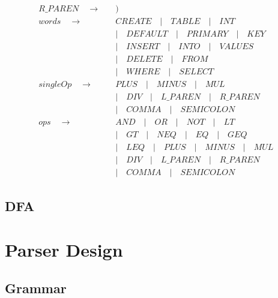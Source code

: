 \documentclass{article}
\begin{document}
\begin{align*}
R\_PAREN \quad\to\quad & \texttt{)} \\
words \quad\to\quad & CREATE \quad | \quad TABLE  \quad | \quad INT \\
&| \quad DEFAULT \quad | \quad PRIMARY \quad | \quad KEY \quad \\
&| \quad INSERT \quad | \quad INTO \quad | \quad VALUES \quad \\
&| \quad DELETE \quad | \quad FROM \quad \\
&| \quad WHERE \quad | \quad SELECT \\
singleOp \quad\to\quad &
PLUS \quad | \quad MINUS \quad | \quad MUL \\
&| \quad DIV \quad | \quad L\_PAREN \quad | \quad R\_PAREN \\
&| \quad COMMA \quad | \quad SEMICOLON \\
ops \quad\to\quad &
AND \quad | \quad OR \quad | \quad NOT \quad | \quad LT \\
&| \quad GT \quad | \quad NEQ \quad | \quad EQ \quad | \quad GEQ \\
&| \quad LEQ \quad | \quad PLUS \quad | \quad MINUS \quad | \quad MUL \\
&| \quad DIV \quad | \quad L\_PAREN \quad | \quad R\_PAREN \\
&| \quad COMMA \quad | \quad SEMICOLON
\end{align*}
\subsection{DFA}

\section{Parser Design}

\subsection{Grammar}
\end{document}
